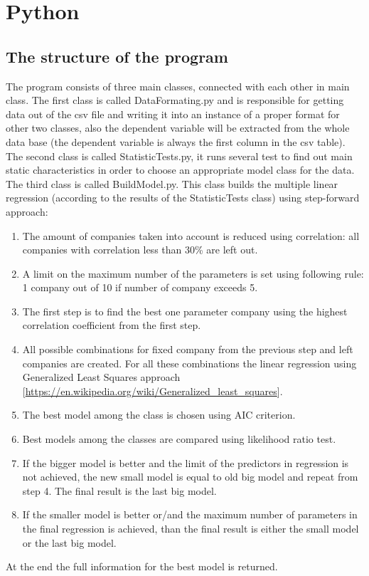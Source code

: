 \documentclass{article}
\begin{document}
\section{Python}
\subsection{The structure of the program}
The program consists of three main classes, connected with each other in main class. The first class is called DataFormating.py and is responsible for getting data out of the csv file and writing it into an instance of a proper format for other two classes, also the dependent variable will be extracted from the whole data base (the dependent variable is always the first column in the csv table).\\
The second class is called StatisticTests.py, it runs several test to find out main static characteristics in order to choose an appropriate model class for the data.\\
The third class is called BuildModel.py. This class builds the multiple linear regression (according to the results of the StatisticTests class) using step-forward approach:
\begin{enumerate}
    \item The amount of companies taken into account is reduced using correlation: all companies with correlation less than 30\% are left out.
    \item A limit on the maximum number of the parameters is set using following rule: 1 company out of 10 if number of company exceeds 5.
    \item The first step is to find the best one parameter company using the highest correlation coefficient from the first step.
    \item All possible combinations for fixed company from the previous step and left companies are created. For all these combinations the linear regression using Generalized Least Squares approach [\url{https://en.wikipedia.org/wiki/Generalized_least_squares}].
    \item The best model among the class is chosen using AIC criterion.
    \item Best models among the classes are compared using likelihood ratio test. 
    \item If the bigger model is better and the limit of the predictors in regression is not achieved, the new small model is equal to old big model and repeat from step 4. The final result is the last big model.
    \item If the smaller model is better or/and the maximum number of parameters in the final regression is achieved, than the final result is either the small model or the last big model. 
\end{enumerate} 
At the end the full information for the best model is returned.
\end{document}
